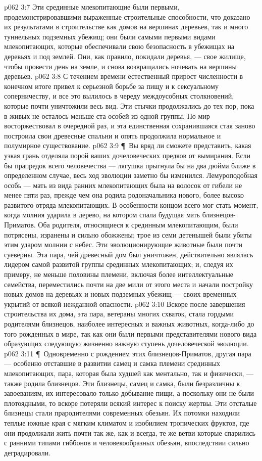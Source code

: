\vs p062 3:7 Эти срединные млекопитающие были первыми, продемонстрировавшими выраженные строительные способности, что доказано их результатами в строительстве как домов на вершинах деревьев, так и много туннельных подземных убежищ; они были самыми первыми видами млекопитающих, которые обеспечивали свою безопасность в убежищах на деревьях и под землей. Они, как правило, покидали деревья, --- свое жилище, чтобы провести день на земле, и снова возвращались ночевать на вершины деревьев.
\vs p062 3:8 С течением времени естественный прирост численности в конечном итоге привел к серьезной борьбе за пищу и к сексуальному соперничеству, и все это вылилось в череду междоусобных столкновений, которые почти уничтожили весь вид. Эти стычки продолжались до тех пор, пока в живых не осталось меньше ста особей из одной группы. Но мир восторжествовал в очередной раз, и эта единственная сохранившаяся стая заново построила свои древесные спальни и опять продолжила нормальное и полумирное существование.
\vs p062 3:9 \P\ Вы вряд ли сможете представить, какая узкая грань отделяла порой ваших дочеловеческих предков от вымирания. Если бы прапредок всего человечества --- лягушка прыгнула бы на два дюйма ближе в определенном случае, весь ход эволюции заметно бы изменился. Лемуроподобная особь --- мать из вида ранних млекопитающих была на волосок от гибели не менее пяти раз, прежде чем она родила родоначальника нового, более высоко развитого отряда млекопитающих. В особенности концом всего мог стать момент, когда молния ударила в дерево, на котором спала будущая мать близнецов\hyp{}Приматов. Оба родителя, относящиеся к срединным млекопитающим, были потрясены, изранены и сильно обожжены; трое из семи детенышей были убиты этим ударом молнии с небес. Эти эволюционирующие животные были почти суеверны. Эта пара, чей древесный дом был уничтожен, действительно являлась лидером самой развитой группы срединных млекопитающих; и, следуя их примеру, не меньше половины племени, включая более интеллектуальные семейства, переместились почти на две мили от этого места и начали постройку новых домов на деревьях и новых подземных убежищ --- своих временных укрытий от всякой нежданной опасности.
\vs p062 3:10 Вскоре после завершения строительства их дома, эта пара, ветераны многих схваток, стала гордыми родителями близнецов, наиболее интересных и важных животных, когда\hyp{}либо до того рожденных в мире, так как они были первыми представителями нового вида  образующих следующую жизненно важную ступень дочеловеческой эволюции.
\vs p062 3:11 \P\ Одновременно с рождением этих близнецов\hyp{}Приматов, другая пара --- особенно отставшие в развитии самец и самка племени срединных млекопитающих, пара, которая была худшей как ментально, так и физически, --- также родила близнецов. Эти близнецы, самец и самка, были безразличны к завоеваниям, их интересовало только добывание пищи, а поскольку они не были плотоядными, то вскоре потеряли всякий интерес к поиску жертвы. Эти отсталые близнецы стали прародителями современных обезьян. Их потомки находили теплые южные края с мягким климатом и изобилием тропических фруктов, где они продолжали жить почти так же, как и всегда, те же ветви которые спарились с ранними типами гиббонов и человекообразных обезьян, впоследствии сильно деградировали.
